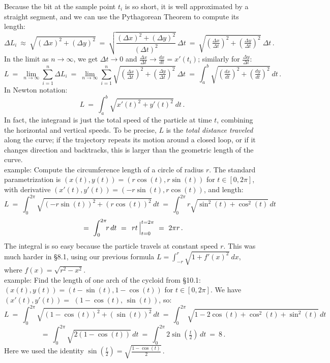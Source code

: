 \documentclass[11pt]{article}
\begin{document}
\noindent
Because the bit at the sample point $t_i$ is so short, 
it is well approximated by a straight segment, and we can 
use the Pythagorean Theorem to compute its length:
$$
\Delta L_i  \ \approx\ \sqrt{(\Delta x)^2+(\Delta y)^2}
\ =\ 
\sqrt{\frac{(\Delta x)^2+(\Delta y)^2}{(\Delta t)^2}}\  \Delta t
\ =\ 
\sqrt{(\tfrac{\Delta x}{\Delta t})^2+(\tfrac{\Delta y}{\Delta t})^2}\  \Delta t\,.
$$
In the limit as $n\to \infty$, we get $\Delta t\to0$  and $\frac{\Delta x}{\Delta t}\to \frac{dx}{dt} = x'(t_i)$; similarly for $\frac{\Delta y}{\Delta t}$:
$$
L \ =\ \lim_{n\to\infty} \sum_{i=1}^n\Delta L_i \ =\ \lim_{n\to\infty}\sum_{i=1}^n\! \sqrt{(\tfrac{\Delta x}{\Delta t})^2+(\tfrac{\Delta y}{\Delta t})^2}\ \Delta t
\ = \ \int_a^b\!\!\! \sqrt{(\tfrac{dx}{dt})^2+(\tfrac{dy}{dt})^2}\ dt\,.
$$
In Newton notation:
$$
L  \ = \ \int_a^b\!\!\! \sqrt{x'(t)^2+y'(t)^2}\ dt\,.
$$
In fact, the integrand is just the total speed of the particle at time $t$, combining the horizontal and vertical speeds. To be precise, $L$ is the {\it total distance traveled} along the curve;
if the trajectory repeats its motion around a closed loop, or if it changes direction and backtracks, 
this is larger than the geometric length of the curve.
\\[.5em]
{\sc example:} Compute the circumference length of a circle of radius $r$.
The standard parametrization is $(x(t),y(t))=(r \cos(t), r\sin(t))$ for $t\in[0,2\pi]$, with 
derivative $(x'(t),y'(t)) = (-r\sin(t),r\cos(t))$, and length:
$$
L \ =\ \int_0^{2\pi} \!\!\!\!\sqrt{(-r\sin(t))^2 + (r\cos(t))^2}\,dt
\ =\ \int_0^{2\pi} \!\!r \sqrt{\sin^2(t) + \cos^2(t)}\,dt
$$
$$
\ =\ \int_0^{2\pi} \!\!r \,dt \ =\ \left.\vphantom{\sum}rt\,\right|_{t=0}^{t=2\pi} \ =\ 2\pi r\,.
$$
The integral is so easy because the particle travels at constant speed $r$.
This was much harder in \S8.1, using our previous formula $L = \int_{-r}^r\! \sqrt{1{+}f'(x)^2}\ dx$, where $f(x)=\sqrt{r^2-x^2}$.
\\[.5em]
{\sc example:} Find the length of one arch of the cycloid from \S10.1:
$(x(t),y(t))=(t{-}\sin(t), 1{-}\cos(t))$ for $t\in[0,2\pi]$. We have $(x'(t),y'(t))=$ $(1{-}\cos(t),\, \sin(t))$, so:
$$
L
\ =\ 
\int_0^{2\pi}\!\!\! \sqrt{(1{-}\cos(t))^2+(\sin(t))^2}\,dt
\ =\ 
\int_0^{2\pi}\!\!\! \sqrt{1{-}2\cos(t)+\cos^2(t)+\sin^2(t)}\,dt
$$
$$
\ =\  
\int_0^{2\pi}\!\!\! \sqrt{2(1{-}\cos(t))}\,dt 
\ =\
\int_0^{2\pi}\! 2\sin(\tfrac t2)\,dt\ =\ 8\,.
$$
Here we used the identity $\sin(\frac t2) =\sqrt{\frac{1-\cos(t)}2}$\,.
\bigskip
\end{document}
